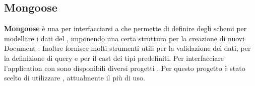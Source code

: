 	\subsection{Mongoose}
\textbf{Mongoose} è una  per interfacciarsi a  che permette di definire degli schemi per modellare i dati del , imponendo una certa struttura per la creazione di nuovi Document . Inoltre fornisce molti strumenti utili per la validazione dei dati, per la definizione di query e per il cast dei tipi predefiniti.
Per interfacciare l'application  con  sono disponibili diversi progetti . Per questo progetto è stato scelto di utilizzare  , attualmente il più di uso.